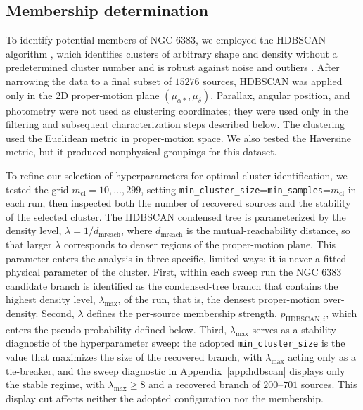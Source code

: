\documentclass{aa}
\begin{document}
\subsection{Membership determination}\label{subsubsec:membership}
To identify potential members of NGC 6383, we employed the HDBSCAN algorithm \citep{10.1007/978-3-642-37456-2_14,McInnes2017}, which identifies clusters of arbitrary shape and density without a predetermined cluster number and is robust against noise and outliers \citep{2021A&A...646A.104H}. After narrowing the data to a final subset of $15276$ sources, HDBSCAN was applied only in the 2D proper-motion plane $(\mu_{\alpha*},\mu_\delta)$. Parallax, angular position, and photometry were not used as clustering coordinates; they were used only in the filtering and subsequent characterization steps described below. The clustering used the Euclidean metric in proper-motion space. We also tested the Haversine metric, but it produced nonphysical groupings for this dataset.

To refine our selection of hyperparameters for optimal cluster identification, we tested the grid $m_{\mathrm{cl}}=10,\ldots,299$, setting \texttt{min\_cluster\_size}=\texttt{min\_samples}=$m_{\mathrm{cl}}$ in each run, then inspected both the number of recovered sources and the stability of the selected cluster. The HDBSCAN condensed tree is parameterized by the density level, $\lambda=1/d_{\mathrm{mreach}}$, where $d_{\mathrm{mreach}}$ is the mutual-reachability distance, so that larger $\lambda$ corresponds to denser regions of the proper-motion plane. This parameter enters the analysis in three specific, limited ways; it is never a fitted physical parameter of the cluster. First, within each sweep run the NGC 6383 candidate branch is identified as the condensed-tree branch that contains the highest density level, $\lambda_{\mathrm{max}}$, of the run, that is, the densest proper-motion over-density. Second, $\lambda$ defines the per-source membership strength, $p_{\mathrm{HDBSCAN},i}$, which enters the pseudo-probability defined below. Third, $\lambda_{\mathrm{max}}$ serves as a stability diagnostic of the hyperparameter sweep: the adopted \texttt{min\_cluster\_size} is the value that maximizes the size of the recovered branch, with $\lambda_{\mathrm{max}}$ acting only as a tie-breaker, and the sweep diagnostic in Appendix~\ref{app:hdbscan} displays only the stable regime, with $\lambda_{\mathrm{max}}\geq8$ and a recovered branch of $200$--$701$ sources. This display cut affects neither the adopted configuration nor the membership.
\end{document}
